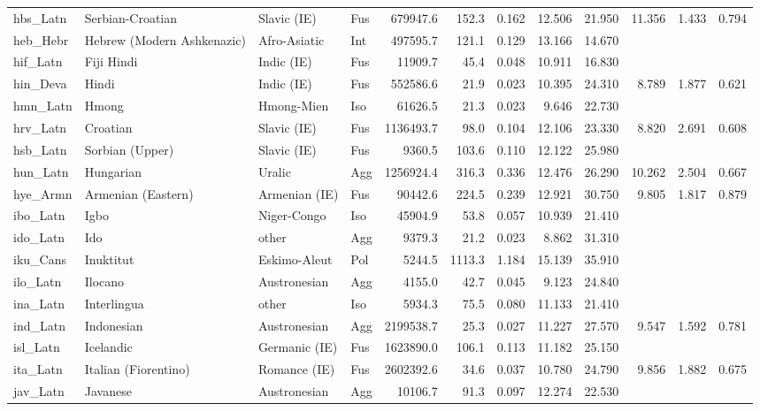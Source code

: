 \begin{tabular}{ll l l rr rr r rr r}
hbs\_Latn & Serbian-Croatian & Slavic (IE) & Fus & 679947.6 & 152.3 & 0.162 & 12.506 & 21.950 & 11.356 & 1.433 & 0.794 \\
heb\_Hebr & Hebrew (Modern Ashkenazic) & Afro-Asiatic & Int & 497595.7 & 121.1 & 0.129 & 13.166 & 14.670 &  &  &  \\
hif\_Latn & Fiji Hindi & Indic (IE) & Fus & 11909.7 & 45.4 & 0.048 & 10.911 & 16.830 &  &  &  \\
hin\_Deva & Hindi & Indic (IE) & Fus & 552586.6 & 21.9 & 0.023 & 10.395 & 24.310 & 8.789 & 1.877 & 0.621 \\
hmn\_Latn & Hmong & Hmong-Mien & Iso & 61626.5 & 21.3 & 0.023 & 9.646 & 22.730 &  &  &  \\
hrv\_Latn & Croatian & Slavic (IE) & Fus & 1136493.7 & 98.0 & 0.104 & 12.106 & 23.330 & 8.820 & 2.691 & 0.608 \\
hsb\_Latn & Sorbian (Upper) & Slavic (IE) & Fus & 9360.5 & 103.6 & 0.110 & 12.122 & 25.980 &  &  &  \\
hun\_Latn & Hungarian & Uralic & Agg & 1256924.4 & 316.3 & 0.336 & 12.476 & 26.290 & 10.262 & 2.504 & 0.667 \\
hye\_Armn & Armenian (Eastern) & Armenian (IE) & Fus & 90442.6 & 224.5 & 0.239 & 12.921 & 30.750 & 9.805 & 1.817 & 0.879 \\
ibo\_Latn & Igbo & Niger-Congo & Iso & 45904.9 & 53.8 & 0.057 & 10.939 & 21.410 &  &  &  \\
ido\_Latn & Ido & other & Agg & 9379.3 & 21.2 & 0.023 & 8.862 & 31.310 &  &  &  \\
iku\_Cans & Inuktitut & Eskimo-Aleut & Pol & 5244.5 & 1113.3 & 1.184 & 15.139 & 35.910 &  &  &  \\
ilo\_Latn & Ilocano & Austronesian & Agg & 4155.0 & 42.7 & 0.045 & 9.123 & 24.840 &  &  &  \\
ina\_Latn & Interlingua & other & Iso & 5934.3 & 75.5 & 0.080 & 11.133 & 21.410 &  &  &  \\
ind\_Latn & Indonesian & Austronesian & Agg & 2199538.7 & 25.3 & 0.027 & 11.227 & 27.570 & 9.547 & 1.592 & 0.781 \\
isl\_Latn & Icelandic & Germanic (IE) & Fus & 1623890.0 & 106.1 & 0.113 & 11.182 & 25.150 &  &  &  \\
ita\_Latn & Italian (Fiorentino) & Romance (IE) & Fus & 2602392.6 & 34.6 & 0.037 & 10.780 & 24.790 & 9.856 & 1.882 & 0.675 \\
jav\_Latn & Javanese & Austronesian & Agg & 10106.7 & 91.3 & 0.097 & 12.274 & 22.530 &  &  &  \\

\end{tabular}
